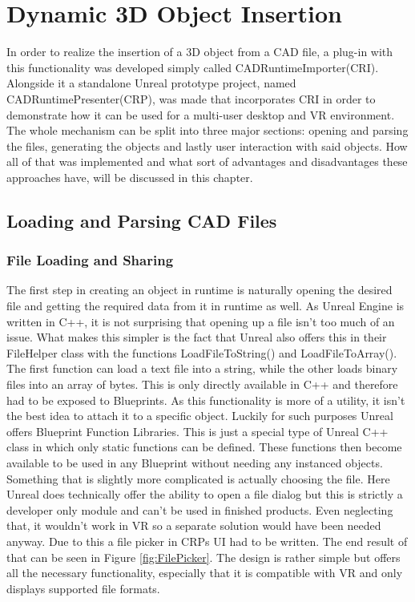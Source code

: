\chapter{Dynamic 3D Object Insertion}\label{chp:ObjectLoading}

In order to realize the insertion of a 3D object from a CAD file, a plug-in with this functionality was developed simply called CADRuntimeImporter(CRI). Alongside it a standalone Unreal prototype project, named CADRuntimePresenter(CRP), was made that incorporates CRI in order to demonstrate how it can be used for a multi-user desktop and VR environment. The whole mechanism can be split into three major sections: opening and parsing the files, generating the objects and lastly user interaction with said objects. How all of that was implemented and what sort of advantages and disadvantages these approaches have, will be discussed in this chapter.
\section{Loading and Parsing CAD Files}
\subsection{File Loading and Sharing}
The first step in creating an object in runtime is naturally opening the desired file and getting the required data from it in runtime as well. As Unreal Engine is written in C++, it is not surprising that opening up a file isn't too much of an issue. What makes this simpler is the fact that Unreal also offers this in their FileHelper class with the functions LoadFileToString() and LoadFileToArray(). The first function can load a text file into a string, while the other loads binary files into an array of bytes. This is only directly available in C++ and therefore had to be exposed to Blueprints. As this functionality is more of a utility, it isn't the best idea to attach it to a specific object. Luckily for such purposes Unreal offers Blueprint Function Libraries. This is just a special type of Unreal C++ class in which only static functions can be defined. These functions then become available to be used in any Blueprint without needing any instanced objects.\\

Something that is slightly more complicated is actually choosing the file. Here Unreal does technically offer the ability to open a file dialog but this is strictly a developer only module and can't be used in finished products. Even neglecting that, it wouldn't work in VR so a separate solution would have been needed anyway. Due to this a file picker in CRPs UI had to be written. The end result of that can be seen in Figure \ref{fig:FilePicker}. The design is rather simple but offers all the necessary functionality, especially that it is compatible with VR and only displays supported file formats.\\

